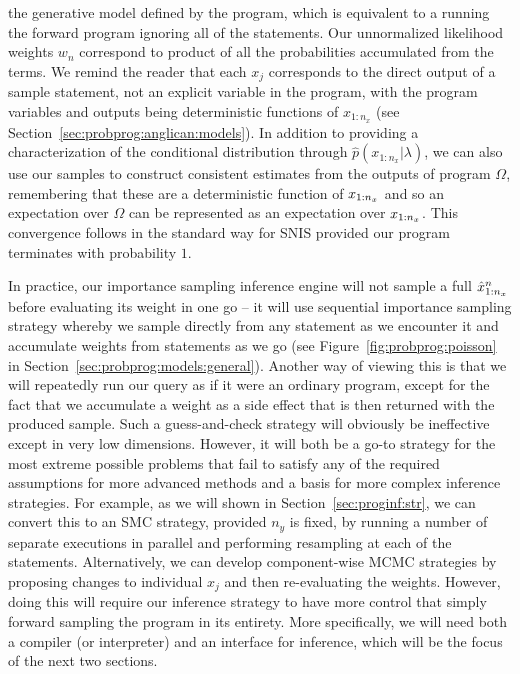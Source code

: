 the generative model defined by the program, which is equivalent to a running the forward program
ignoring all of the \observe statements.  Our unnormalized likelihood weights $w_n$ correspond to
product of all the probabilities accumulated from the \observe terms.  We remind the reader that each 
$x_j$ corresponds to the direct output of a sample statement, not an explicit variable in the program, 
with the program variables and outputs being deterministic functions of $x_{1:n_x}$ (see 
Section~\ref{sec:probprog:anglican:models}). In addition to providing a 
characterization of the conditional distribution through $\hat{p}(x_{1:n_x} | \lambda)$, we can also
use our samples to construct consistent estimates from the outputs of program $\Omega$, remembering
that these are a deterministic function of $x_{1:n_x}$ and so an expectation over $\Omega$ can be
represented as an expectation over $x_{1:n_x}$.
This convergence follows in the standard way for SNIS provided our program terminates with probability $1$.

In practice, our importance sampling inference engine will not sample a full $\hat{x}_{1:n_x}^n$ before 
evaluating its weight in one go -- it will use
sequential importance sampling strategy whereby we sample directly from any \sample statement as we encounter it
and accumulate weights from \observe statements as we go (see Figure~\ref{fig:probprog:poisson} in
Section~\ref{sec:probprog:models:general}).
Another way of viewing this is that we will repeatedly run our query as if it were an ordinary
program, except for the fact that we accumulate a weight as a side effect that is then returned with
the produced sample.  Such a guess-and-check strategy will obviously be ineffective except in very low
dimensions.  However, it will both be a go-to strategy for the most extreme possible problems that
fail to satisfy any of the required assumptions for more advanced methods and a basis for more complex 
inference strategies.  For example, as we will shown in Section~\ref{sec:proginf:str}, we can
convert this to an SMC strategy, provided $n_y$ is fixed, by running a number of separate executions
in parallel and performing resampling at each of the \observe statements.  Alternatively, we can
develop component-wise MCMC strategies by proposing changes to individual $x_j$ and then
re-evaluating the weights.  However, doing this will require our inference strategy to have more
control that simply forward sampling the program in its entirety.  More specifically, we will need both a compiler
(or interpreter) and an interface for inference, which will be the focus of the next two sections.